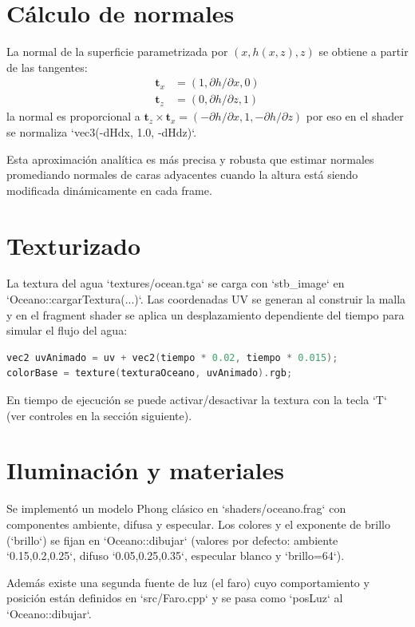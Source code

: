 \documentclass[11pt]{article}
\begin{document}
\section{Cálculo de normales}
La normal de la superficie parametrizada por $(x, h(x,z), z)$ se obtiene a
partir de las tangentes:
\begin{align*}
\mathbf{t}_x &= (1, \partial h/\partial x, 0) \\
\mathbf{t}_z &= (0, \partial h/\partial z, 1)
\end{align*}
la normal es proporcional a $\mathbf{t}_z \times \mathbf{t}_x = (-\partial h/\partial x, 1, -\partial h/\partial z)$
por eso en el shader se normaliza `vec3(-dHdx, 1.0, -dHdz)`.

Esta aproximación analítica es más precisa y robusta que estimar normales
promediando normales de caras adyacentes cuando la altura está siendo
modificada dinámicamente en cada frame.

\section{Texturizado}
La textura del agua `textures/ocean.tga` se carga con `stb_image` en
`Oceano::cargarTextura(...)`. Las coordenadas UV se generan al construir la
malla y en el fragment shader se aplica un desplazamiento dependiente del
tiempo para simular el flujo del agua:
\begin{lstlisting}[language=C,caption={Animación de UV en `shaders/oceano.frag`}]
vec2 uvAnimado = uv + vec2(tiempo * 0.02, tiempo * 0.015);
colorBase = texture(texturaOceano, uvAnimado).rgb;
\end{lstlisting}

En tiempo de ejecución se puede activar/desactivar la textura con la tecla
`T` (ver controles en la sección siguiente).

\section{Iluminación y materiales}
Se implementó un modelo Phong clásico en `shaders/oceano.frag` con componentes
ambiente, difusa y especular. Los colores y el exponente de brillo (`brillo`)
se fijan en `Oceano::dibujar` (valores por defecto: ambiente `0.15,0.2,0.25`,
difuso `0.05,0.25,0.35`, especular blanco y `brillo=64`).

Además existe una segunda fuente de luz (el faro) cuyo comportamiento y
posición están definidos en `src/Faro.cpp` y se pasa como `posLuz` al
`Oceano::dibujar`.
\end{document}
